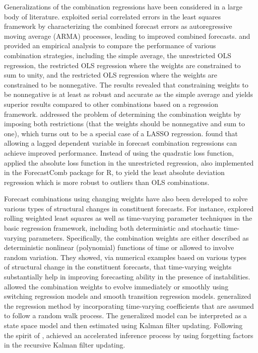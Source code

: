 \documentclass[a4paper,11pt]{article}
\newcommand{\pkg}[1]{{\normalfont\fontseries{b}\selectfont #1}}
\let\proglang=\textsf
\begin{document}
Generalizations of the combination regressions have been considered in a large body of literature. \citet{Diebold1988-sx} exploited serial correlated errors in the least squares framework by characterizing the combined forecast errors as autoregressive moving average (ARMA) processes, leading to improved combined forecasts. \citet{Gunter1992-go} and \citet{Aksu1992-lb} provided an empirical analysis to compare the performance of various combination strategies, including the simple average, the unrestricted OLS regression, the restricted OLS regression where the weights are constrained to sum to unity, and the restricted OLS regression where the weights are constrained to be nonnegative. The results revealed that constraining weights to be nonnegative is at least as robust and accurate as the simple average and yields superior results compared to other combinations based on a regression framework. \citet{Conflitti2015-fq} addressed the problem of determining the combination weights by imposing both restrictions (that the weights should be nonnegative and sum to one), which turns out to be a special case of a LASSO regression. \citet{Edward_Coulson1993-db} found that allowing a lagged dependent variable in forecast combination regressions can achieve improved performance. Instead of using the quadratic loss function, \citet{Nowotarski2014-ev} applied the absolute loss function in the unrestricted regression, also implemented in the \pkg{ForecastComb} package for \proglang{R}, to yield the least absolute deviation regression which is more robust to outliers than OLS combinations.

Forecast combinations using changing weights have also been developed to solve various types of structural changes in constituent forecasts. For instance, \citet{Diebold1987-go} explored rolling weighted least squares as well as time-varying parameter techniques in the basic regression framework, including both deterministic and stochastic time-varying parameters. Specifically, the combination weights are either described as deterministic nonlinear (polynomial) functions of time or allowed to involve random variation. They showed, via numerical examples based on various types of structural change in the constituent forecasts, that time-varying weights substantially help in improving forecasting ability in the presence of instabilities. \citet{Deutsch1994-ob} allowed the combination weights to evolve immediately or smoothly using switching regression models and smooth transition regression models. \citet{Terui2002-df} generalized the regression method by incorporating time-varying coefficients that are assumed to follow a random walk process. The generalized model can be interpreted as a state space model and then estimated using Kalman filter updating. Following the spirit of \citet{Terui2002-df}, \citet{Raftery2010-qe} achieved an accelerated inference process by using forgetting factors in the recursive Kalman filter updating.
\end{document}
